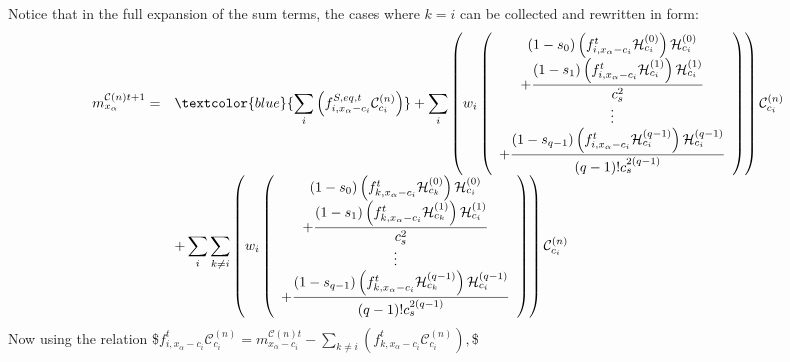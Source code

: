 \documentclass[letterpaper,10pt,english,openany,oneside]{jupyterBook}
\begin{document}
\sphinxAtStartPar
Notice that in the full expansion of the sum terms, the cases where \(k=i\) can be collected and rewritten in form:
\begin{equation*}
\begin{split}
\begin{array}{rl}
m_{x_{\alpha}}^{\mathcal{C}(n)t+1} =  & \textcolor{blue}{\displaystyle\sum_{i}\left(f_{i,x_{\alpha}-c_{i}}^{S,eq,t}\mathcal{C}_{c_{i}}^{(n)}\right)} + \displaystyle\sum_{i}\left( w_{i}\left(\begin{array}{c} (1-s_{0})\left(f^{t}_{i,x_{\alpha}-c_{i}}\mathcal{H}^{(0)}_{c_{i}}\right)\mathcal{H}^{(0)}_{c_{i}}\\ + \displaystyle\frac{(1-s_{1})\left(f^{t}_{i,x_{\alpha}-c_{i}}\mathcal{H}^{(1)}_{c_{i}}\right)\mathcal{H}^{(1)}_{c_{i}}}{c_{s}^{2}}\\  \vdots \\ + \displaystyle\frac{(1-s_{q-1})\left( f^{t}_{i,x_{\alpha}-c_{i}}\mathcal{H}^{(q-1)}_{c_{i}}\right)\mathcal{H}^{(q-1)}_{c_{i}}}{(q-1)!c_{s}^{2(q-1)}} \end{array} \right) \right)\mathcal{C}_{c_{i}}^{(n)} \\
&+ \displaystyle\sum_{i}\displaystyle\sum_{k\neq i}\left( w_{i}\left(\begin{array}{c} (1-s_{0})\left(f^{t}_{k,x_{\alpha}-c_{i}}\mathcal{H}^{(0)}_{c_{k}}\right)\mathcal{H}^{(0)}_{c_{i}}\\ + \displaystyle\frac{(1-s_{1})\left( f^{t}_{k,x_{\alpha}-c_{i}}\mathcal{H}^{(1)}_{c_{k}}\right)\mathcal{H}^{(1)}_{c_{i}}}{c_{s}^{2}}\\  \vdots \\ + \displaystyle\frac{(1-s_{q-1})\left( f^{t}_{k,x_{\alpha}-c_{i}}\mathcal{H}^{(q-1)}_{c_{k}}\right)\mathcal{H}^{(q-1)}_{c_{i}}}{(q-1)!c_{s}^{2(q-1)}} \end{array} \right) \right)\mathcal{C}_{c_{i}}^{(n)}
\end{array}
\end{split}
\end{equation*}
\sphinxAtStartPar
Now using the relation
\$\(
 f_{i,x_{\alpha}-c_{i}}^{t}\mathcal{C}_{c_{i}}^{(n)}  =   m_{x_{\alpha}-c_{i}}^{\mathcal{C}(n)t} -  \sum_{k\neq i} \left(f_{k,x_{\alpha}-c_{i}}^{t}\mathcal{C}_{c_{i}}^{(n)}  \right) ,
\)\$
\end{document}
